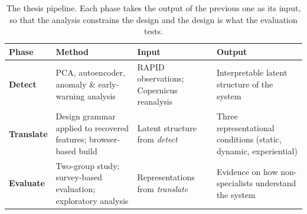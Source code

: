 \begin{table}[!ht]
    \centering
    \small
    \renewcommand{\arraystretch}{1.3}
    \caption[The detect--translate--evaluate workflow.]{The thesis pipeline. Each
    phase takes the output of the previous one as its input, so that the analysis
    constrains the design and the design is what the evaluation tests.}
    \label{tab:workflow}
    \begin{tabular}{@{}>{\raggedright\arraybackslash}p{2.3cm}>{\raggedright\arraybackslash}p{3.5cm}>{\raggedright\arraybackslash}p{3.2cm}>{\raggedright\arraybackslash}p{3.2cm}@{}}
        \toprule
        \textbf{Phase} & \textbf{Method} & \textbf{Input} & \textbf{Output} \\
        \midrule
        \textbf{Detect}
            & PCA, autoencoder, anomaly \& early-warning analysis
            & RAPID observations; Copernicus reanalysis
            & Interpretable latent structure of the system \\
        \textbf{Translate}
            & Design grammar applied to recovered features; browser-based build
            & Latent structure from \emph{detect}
            & Three representational conditions (static, dynamic, experiential) \\
        \textbf{Evaluate}
            & Two-group study; survey-based evaluation; exploratory analysis
            & Representations from \emph{translate}
            & Evidence on how non-specialists understand the system \\
        \bottomrule
    \end{tabular}
\end{table}